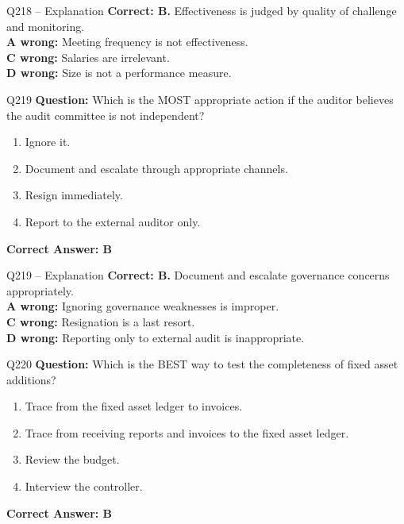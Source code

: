 \documentclass[aspectratio=169,10pt]{beamer}
\begin{document}
	\begin{frame}[t]{Q218 -- Explanation}
		\small
		\textbf{Correct: B.} Effectiveness is judged by quality of challenge and monitoring. \\[4pt]
		\textbf{A wrong:} Meeting frequency is not effectiveness. \\[2pt]
		\textbf{C wrong:} Salaries are irrelevant. \\[2pt]
		\textbf{D wrong:} Size is not a performance measure.
	\end{frame}
	
	\begin{frame}[t]{Q219}
		\small
		\textbf{Question:} Which is the MOST appropriate action if the auditor believes the audit committee is not independent?
		\begin{enumerate}[label=\Alph*.,itemsep=1pt,topsep=2pt]
			\item Ignore it.
			\item Document and escalate through appropriate channels.
			\item Resign immediately.
			\item Report to the external auditor only.
		\end{enumerate}
		\vspace{4pt}
		\textbf{Correct Answer: B}
	\end{frame}
	
	\begin{frame}[t]{Q219 -- Explanation}
		\small
		\textbf{Correct: B.} Document and escalate governance concerns appropriately. \\[4pt]
		\textbf{A wrong:} Ignoring governance weaknesses is improper. \\[2pt]
		\textbf{C wrong:} Resignation is a last resort. \\[2pt]
		\textbf{D wrong:} Reporting only to external audit is inappropriate.
	\end{frame}
	
	\begin{frame}[t]{Q220}
		\small
		\textbf{Question:} Which is the BEST way to test the completeness of fixed asset additions?
		\begin{enumerate}[label=\Alph*.,itemsep=1pt,topsep=2pt]
			\item Trace from the fixed asset ledger to invoices.
			\item Trace from receiving reports and invoices to the fixed asset ledger.
			\item Review the budget.
			\item Interview the controller.
		\end{enumerate}
		\vspace{4pt}
		\textbf{Correct Answer: B}
	\end{frame}
	
\end{document}
